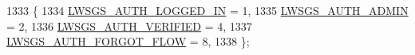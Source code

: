 \begin{DoxyCode}
1333                      \{
1334         \hyperlink{group__generic-sessions_gga7c2dc7bfb4ccb91c5d771f9e9ea237e1a81e63075115dedd150265d81b8f7fa57}{LWSGS\_AUTH\_LOGGED\_IN} = 1, 
1335         \hyperlink{group__generic-sessions_gga7c2dc7bfb4ccb91c5d771f9e9ea237e1a0657a9e846814781b128c397fe4b10bf}{LWSGS\_AUTH\_ADMIN} = 2,   
1336         \hyperlink{group__generic-sessions_gga7c2dc7bfb4ccb91c5d771f9e9ea237e1a5a607e4668d20cadada62c4b8007f887}{LWSGS\_AUTH\_VERIFIED} = 4,  
1337         \hyperlink{group__generic-sessions_gga7c2dc7bfb4ccb91c5d771f9e9ea237e1a2cd8fb86e3b85c106e7711c03f0ddd0a}{LWSGS\_AUTH\_FORGOT\_FLOW} = 8,       
1338 \};
\end{DoxyCode}
